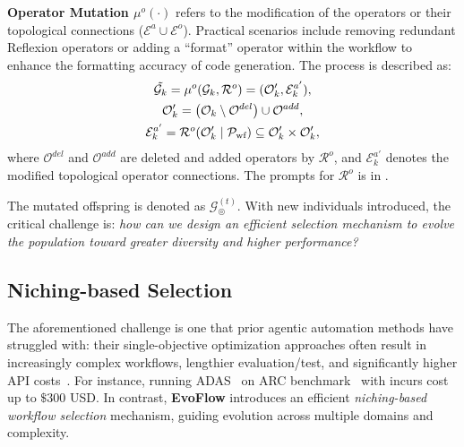\documentclass{article}
\theoremstyle{plain}
\theoremstyle{definition}
\theoremstyle{remark}
\newcommand{\ourmethod}{{\fontfamily{lmtt}\selectfont \textbf{EvoFlow}}\xspace}
\newcommand{\llmname}[1]{{\fontfamily{pcr}\selectfont {#1}}\xspace}
\begin{document}
\textbf{Operator Mutation $\mu^{o}(\cdot)$} refers to the modification of the operators or their topological connections ($\mathcal{E}^a\cup\mathcal{E}^o$). Practical scenarios include removing redundant Reflexion operators or adding a ``format'' operator within the workflow to enhance the formatting accuracy of code generation. The process is described as:  
\begin{equation}
\label{eq:operator-mutation}
\begin{gathered}
\small
\Tilde{\mathcal{G}_k} = \mu^{o}(\mathcal{G}_k,\mathcal{R}^o)  = (\mathcal{O}'_k, \mathcal{E}_k^{a'}), \\
\mathcal{O}'_k = \left(\mathcal{O}_k \setminus \mathcal{O}^{del}\right)\cup \mathcal{O}^{add}, \\\mathcal{E}_k^{a'}=\mathcal{R}^o(\mathcal{O}'_k\mid \mathcal{P}_\text{wf})\subseteq \mathcal{O}'_k\times \mathcal{O}'_k,
\end{gathered}
\end{equation}
where $\mathcal{O}^{del}$ and $\mathcal{O}^{add}$ are deleted and added operators by $\mathcal{R}^o$, and $\mathcal{E}_k^{a'}$ denotes the modified topological operator connections. The prompts for $\mathcal{R}^o$ is in .

The mutated offspring is denoted as \({\mathcal{G}_\circledcirc^{(t)}}\). With new individuals introduced, the critical challenge is: \textit{how can we design an efficient selection mechanism to evolve the population toward greater diversity and higher performance?}

\vspace{-0.5em}
\subsection{Niching-based Selection}\label{sec:niching}
\vspace{-0.5em}
The aforementioned challenge is one that prior agentic automation methods have struggled with: their single-objective optimization approaches often result in increasingly complex workflows, lengthier evaluation/test, and significantly higher API costs~\citep{zhang2024aflow}. For instance, running ADAS~\citep{hu2024adas} on ARC benchmark~\citep{chollet2019arc} with \llmname{gpt-3.5-turbo-0125} incurs cost up to \(\$300\) USD. In contrast, \ourmethod introduces an efficient \textit{niching-based workflow selection} mechanism, guiding evolution across multiple domains and complexity.
\end{document}
